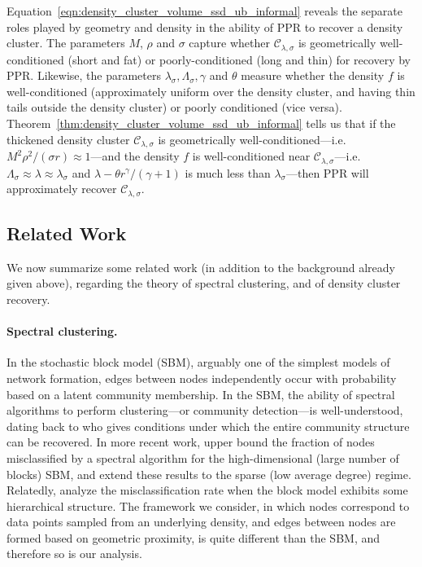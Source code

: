 \documentclass[11pt,twoside]{article}
\newcommand{\1}{\mathbf{1}}
\newcommand{\mc}[1]{\mathcal{#1}}
\begin{document}
Equation~\eqref{eqn:density_cluster_volume_ssd_ub_informal} reveals the separate roles played by geometry and density in the ability of PPR to recover a density cluster. The parameters $M$, $\rho$ and $\sigma$ capture whether $\mc{C}_{\lambda,\sigma}$ is geometrically well-conditioned (short and fat) or poorly-conditioned (long and thin) for recovery by PPR. Likewise, the parameters $\lambda_{\sigma}, \Lambda_{\sigma}, \gamma$ and $\theta$ measure whether the density $f$ is well-conditioned (approximately uniform over the density cluster, and having thin tails outside the density cluster) or poorly conditioned (vice versa). Theorem~\ref{thm:density_cluster_volume_ssd_ub_informal} tells us that if the thickened density cluster $\mc{C}_{\lambda,\sigma}$ is geometrically well-conditioned---i.e. $M^2\rho^2/(\sigma r) \approx 1$---and the density $f$ is well-conditioned near $\mc{C}_{\lambda,\sigma}$---i.e. $\Lambda_{\sigma} \approx \lambda \approx \lambda_{\sigma}$ and $\lambda - \theta r^{\gamma}/(\gamma + 1)$ is much less than $\lambda_{\sigma}$---then PPR will approximately recover $\mc{C}_{\lambda,\sigma}$.

\subsection{Related Work}
\label{subsec:related_work}
We now summarize some related work (in addition to the background already given above), regarding the theory of spectral clustering, and of density cluster recovery.

\paragraph{Spectral clustering.}
In the stochastic block model (SBM), arguably one of the simplest models of network formation, edges between nodes independently occur with probability based on a latent community membership. In the SBM, the ability of spectral algorithms to perform clustering---or community detection---is well-understood, dating 
back to \citet{mcsherry2001} who gives conditions under which the entire
community structure can be recovered. In more recent work, \citet{rohe2011}
upper bound the fraction of nodes misclassified by a spectral algorithm for the
high-dimensional (large number of blocks) SBM, and \citet{lei2015} extend these
results to the sparse (low average degree) regime. Relatedly,
\citet{clauset08,balakrishnan2011,li2018} analyze the misclassification rate
when the block model exhibits some hierarchical structure. The framework we
consider, in which nodes correspond to data points sampled from an underlying 
density, and edges between nodes are formed based on geometric proximity, is
quite different than the SBM, and therefore so is our analysis.
\end{document}
